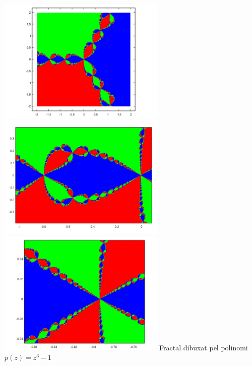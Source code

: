 \documentclass[12pt]{report}
\begin{document}
\begin{center}
    \includegraphics[width=0.6\textwidth]{z3-1.png}
    \newline
    \includegraphics[width=0.6\textwidth]{z3-1_zoom.png}
    \newline
    \includegraphics[width=0.6\textwidth]{z3-1_zoom2.png}
    \newline
Fractal dibuxat pel polinomi $p(z)=z^3-1$
\label{fig:z^3-1}
\end{center}
\end{document}
